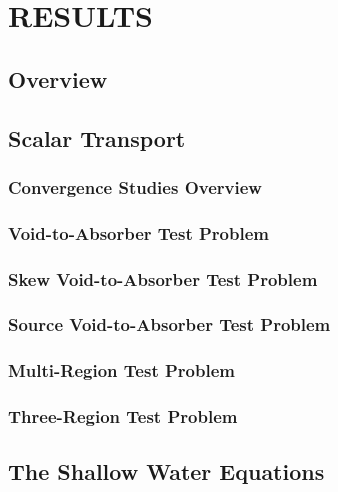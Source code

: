 \chapter{RESULTS}

\section{Overview}
  
\section{Scalar Transport\label{sec:transport_results}}
\subsection{Convergence Studies Overview\label{sec:convergence_overview}}
  
\subsection{Void-to-Absorber Test Problem\label{sec:void_to_absorber}}
  
\subsection{Skew Void-to-Absorber Test Problem\label{sec:skew_void_to_absorber}}
  
\subsection{Source Void-to-Absorber Test Problem\label{sec:source_void_to_absorber}}
  
\subsection{Multi-Region Test Problem\label{sec:multi_region}}
  
\subsection{Three-Region Test Problem\label{sec:three_region}}
  
\section{The Shallow Water Equations\label{sec:shallow_water_results}}
